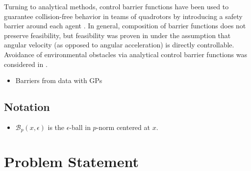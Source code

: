 \documentclass[conference]{IEEEtran}
\begin{document}
Turning to analytical methods, control barrier functions have been used to guarantee collision-free behavior in teams of quadrotors by introducing a safety barrier around each agent \cite{Wang2017a}. In general, composition of barrier functions does not preserve feasibility, but feasibility was proven in \cite{Wang2017} under the assumption that angular velocity (as opposed to angular acceleration) is directly controllable. Avoidance of environmental obstacles via analytical control barrier functions was considered in \cite{Wu2016}.

\begin{itemize}
  \item Barriers from data with GPs \cite{Wang2017c}
\end{itemize}

\subsection{Notation}

\begin{itemize}
  \item $\mathcal B_p(x,\epsilon)$ is the $\epsilon$-ball in $p$-norm centered at $x$.
\end{itemize}

\section{Problem Statement}
\end{document}

